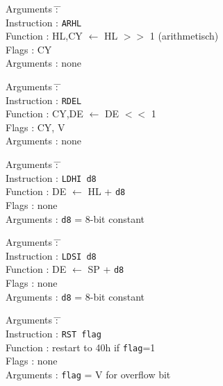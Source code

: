 \documentclass[12pt,twoside]{report}
\newcommand{\tty}[1]{{\tt #1}}
\begin{document}
\begin{tabbing}
Arguments         \= : \= \kill \\
Instruction       \> : \> \tty{ARHL} \\
Function          \> : \> HL,CY $\leftarrow$ HL $>>$ 1 (arithmetisch) \\
Flags             \> : \> CY \\
Arguments         \> : \> none \\
\end{tabbing}

\begin{tabbing}
Arguments         \= : \= \kill \\
Instruction       \> : \> \tty{RDEL} \\
Function          \> : \> CY,DE $\leftarrow$ DE $<<$ 1 \\
Flags             \> : \> CY, V \\
Arguments         \> : \> none \\
\end{tabbing}

\begin{tabbing}
Arguments         \= : \= \kill \\
Instruction       \> : \> \tty{LDHI d8} \\
Function          \> : \> DE $\leftarrow$ HL + {\tt d8} \\
Flags             \> : \> none \\
Arguments         \> : \> {\tt d8} = 8-bit constant \\
\end{tabbing}

\begin{tabbing}
Arguments         \= : \= \kill \\
Instruction       \> : \> \tty{LDSI d8} \\
Function          \> : \> DE $\leftarrow$ SP + {\tt d8} \\
Flags             \> : \> none \\
Arguments         \> : \> {\tt d8} = 8-bit constant \\
\end{tabbing}

\begin{tabbing}
Arguments         \= : \= \kill \\
Instruction       \> : \> \tty{RST flag} \\
Function          \> : \> restart to 40h if {\tt flag}=1 \\
Flags             \> : \> none \\
Arguments         \> : \> {\tt flag} = V for overflow bit \\
\end{tabbing}
\end{document}
